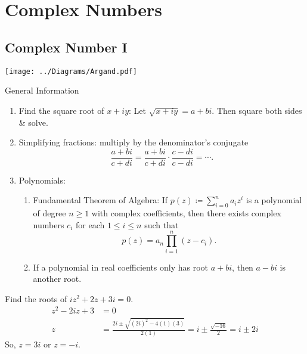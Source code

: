 \documentclass[oneside]{book}
\begin{document}
  \chapter{Complex Numbers}
  \section{Complex Number I}
  \begin{center}
    \texttt{[image: ../Diagrams/Argand.pdf]}
  \end{center}
  \begin{stbox}{General Information}
    \begin{enumerate}
      \item Find the square root of \(x+iy\): Let \(\sqrt{x+iy}=a+bi\). Then square both sides \& solve.
      \item Simplifying fractions: multiply by the denominator's conjugate
      \[\frac{a+bi}{c+di}=\frac{a+bi}{c+di}\cdot\frac{c-di}{c-di}=\cdots.\]
      \item Polynomials:
      \begin{enumerate}
        \item Fundamental Theorem of Algebra: If \(p(z)\coloneq \sum_{i=0}^{n}a_iz^i\) is a polynomial of degree \(n \geq 1\) with complex coefficients, then there exists complex numbers \(c_i\) for each \(1 \leq i \leq n\) such that 
        \[p(z)=a_n \prod_{i=1}^{n}(z-c_i).\]
        \item If a polynomial in real coefficients only has root \(a+bi\), then \(a-bi\) is another root.
      \end{enumerate}
    \end{enumerate}
    \end{stbox}
        \begin{example}{}{}
          Find the roots of \(iz^2+2z+3i=0\).
          \begin{align*}
            z^2-2iz+3&=0\\
            z&=\frac{2i \pm \sqrt{(2i)^2-4(1)(3)}}{2(1)}=i \pm \frac{\sqrt{-16}}{2}=i \pm 2i
          \end{align*}
          So, \(z=3i\) or \(z=-i\).
        \end{example}
\end{document}
